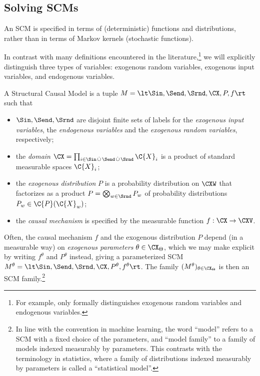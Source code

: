 \subsection{Solving SCMs}

An SCM is specified in terms of (deterministic) functions and distributions,
rather than in terms of Markov kernels (stochastic functions).

In contrast with many definitions encountered in the literature,\footnote{For
example, \cite{Pearl09} only formally distinguishes exogenous random variables and 
endogenous variables.} we will explicitly distinguish
three types of variables: exogenous random variables, exogenous input variables, and endogenous variables.
\begin{Def}\label{def:scm}
  A Structural Causal Model is a tuple $M = \lt \Sin, \Send, \Srnd, \CX, P, f \rt$ such that
  \begin{itemize}
    \item $\Sin, \Send, \Srnd$ are disjoint finite sets of labels for the \emph{exogenous input variables}, the \emph{endogenous variables} and the \emph{exogenous random variables}, respectively;
    \item the \emph{domain} $\CX = \prod_{i\in \Sin \dcup \Send \dcup \Srnd} \C{X}_i$ is a product of standard measurable spaces $\C{X}_i$;
    \item the \emph{exogenous distribution} $P$ is a probability distribution on $\CXW$ that factorizes as a product $P = \bigotimes_{w\in\Srnd} P_w$ of probability distributions $P_w \in \C{P}(\C{X}_w)$;
    \item the \emph{causal mechanism} is specified by the measurable function $f : \CX \to \CXV$.
  \end{itemize}
Often, the causal mechanism $f$ and the exogenous distribution $P$ depend (in a measurable way) on 
\emph{exogenous parameters} $\theta\in\CX_\Theta$, which we may make explicit by writing
$f^{\theta}$ and $P^{\theta}$ instead, giving a parameterized SCM
$M^{\theta} = \lt \Sin, \Send, \Srnd, \CX, P^{\theta}, f^{\theta} \rt$.
The family $(M^{\theta})_{\theta \in \CX_\Theta}$ is then an SCM family.\footnote{In line with the convention in machine learning, the word ``model'' refers to a SCM with a fixed choice of the parameters, and ``model family'' to a family of models
indexed measurably by parameters. This contrasts with the terminology in statistics, where a family
of distributions indexed measurably by parameters is called a ``statistical model''.} 
\end{Def}
